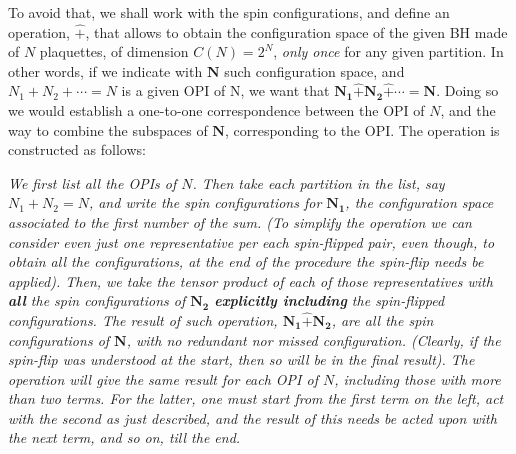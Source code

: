 \documentclass[aps,prd,showkeys,nofootinbib,superscriptaddress]{revtex4-2}
\begin{document}
To avoid that, we shall work with the spin configurations, and define an operation, $\hat{+}$, that allows to obtain the configuration space of the given BH made of $N$ plaquettes, of dimension $C(N) = 2^N$, \textit{only once} for any given partition. In other words, if we indicate with $\mathbf{N}$ such configuration space, and $N_1 + N_2 + \cdots = N$ is a given OPI of N, we want that $\mathbf{N_1} \hat{+} \mathbf{N_2} \hat{+} \cdots = \mathbf{N}$. Doing so we would establish a one-to-one correspondence between the OPI of $N$, and the way to combine the subspaces of $\mathbf{N}$, corresponding to the OPI. The operation is constructed as follows:


\textit{We first list all the OPIs of $N$. Then take each partition in the list, say $N_1 + N_2 = N$, and write the spin configurations for $\mathbf{N_1}$, the configuration space associated to the first number of the sum. (To simplify the operation we can consider even just one representative per each spin-flipped pair, even though, to obtain all the configurations, at the end of the procedure the spin-flip needs be applied). Then, we take the tensor product of each of those representatives with \textbf{all} the spin configurations of $\mathbf{N_2}$ \textbf{explicitly including} the spin-flipped configurations. The result of such operation, $\mathbf{N_1} \hat{+} \mathbf{N_2}$, are all the spin configurations of $\mathbf{N}$, with no redundant nor missed configuration. (Clearly, if the spin-flip was understood at the start, then so will be in the final result). The operation will give the same result for each OPI of $N$, including those with more than two terms. For the latter, one must start from the first term on the left, act with the second as just described, and the result of this needs be acted upon with the next term, and so on, till the end.}
\end{document}
